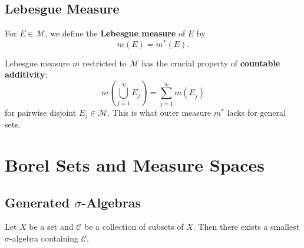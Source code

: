 \documentclass[11pt]{report}
\begin{document}
\subsection{Lebesgue Measure}

\begin{defbox}
For $E \in \mathcal{M}$, we define the \textbf{Lebesgue measure} of $E$ by
\[
m(E) = m^*(E).
\]
\end{defbox}

\begin{rembox}
Lebesgue measure $m$ restricted to $\mathcal{M}$ has the crucial property of \textbf{countable additivity}:
\[
m\left( \bigcup_{j=1}^{\infty} E_j \right) = \sum_{j=1}^{\infty} m(E_j)
\]
for pairwise disjoint $E_j \in \mathcal{M}$. This is what outer measure $m^*$ lacks for general sets.
\end{rembox}

\section{Borel Sets and Measure Spaces}

\subsection{Generated $\sigma$-Algebras}

\begin{propbox}
Let $X$ be a set and $\mathcal{C}$ be a collection of subsets of $X$. Then there exists a smallest $\sigma$-algebra containing $\mathcal{C}$.
\end{propbox}
\end{document}
